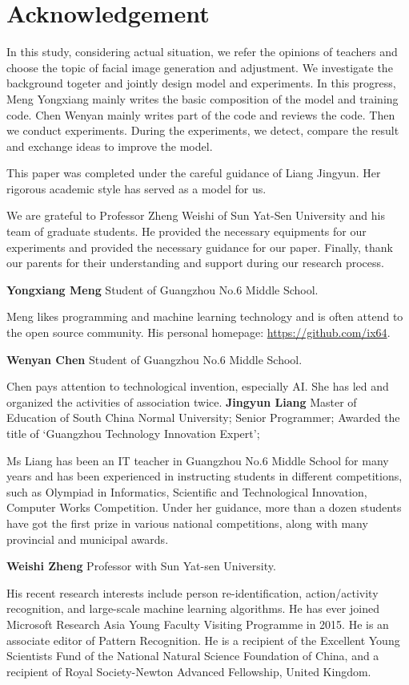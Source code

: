 \section*{Acknowledgement}

In this study, considering actual situation,
    we refer the opinions of teachers and choose the topic of facial image generation and adjustment.
We investigate the background togeter and jointly design model and experiments.
In this progress, Meng Yongxiang mainly writes the basic composition of the model and training code.
Chen Wenyan mainly writes part of the code and reviews the code.
Then we conduct experiments.
During the experiments, we detect, compare the result and exchange ideas to improve the model.

This paper was completed under the careful guidance of Liang Jingyun.
Her rigorous academic style has served as a model for us.

We are grateful to Professor Zheng Weishi of Sun Yat-Sen University and his team of graduate students.
He provided the necessary equipments for our experiments and provided the necessary guidance for our paper.
Finally, thank our parents for their understanding and support during our research process.

\vspace{4ex}


\textbf{Yongxiang Meng}  Student of Guangzhou No.6 Middle School.

Meng likes programming and machine learning technology and is often attend to the open source community.
His personal homepage: \url{https://github.com/ix64}.


\textbf{Wenyan Chen}  Student of Guangzhou No.6 Middle School.

Chen pays attention to technological invention, especially AI.
She has led and organized the activities of association twice.
\textbf{Jingyun Liang}  Master of Education of South China Normal University;
Senior Programmer;
Awarded the title of ‘Guangzhou Technology Innovation Expert’;

Ms Liang has been an IT teacher in Guangzhou No.6 Middle School for many years and has been experienced in instructing students in different competitions,
    such as Olympiad in Informatics,
    Scientific and Technological Innovation, Computer Works Competition.
Under her guidance, more than a dozen students have got the first prize in various national competitions,
    along with many provincial and municipal awards.


\textbf{Weishi Zheng}  Professor with Sun Yat-sen University.

His recent research interests include person re-identification, action/activity recognition, and large-scale machine learning algorithms.
He has ever joined Microsoft Research Asia Young Faculty Visiting Programme in 2015.
He is an associate editor of Pattern Recognition.
He is a recipient of the Excellent Young Scientists Fund of the National Natural Science Foundation of China,
    and a recipient of Royal Society-Newton Advanced Fellowship, United Kingdom.

